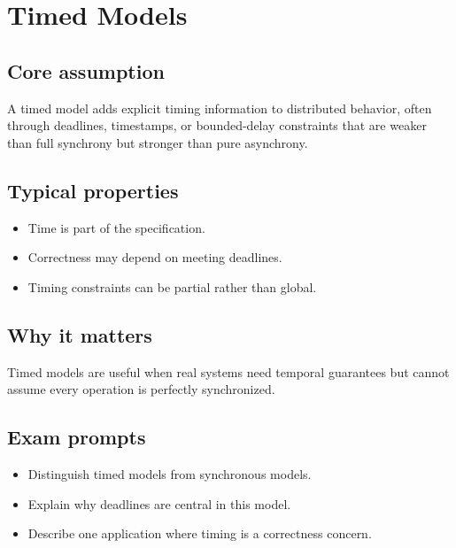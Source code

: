 \chapter{Timed Models}

\section{Core assumption}
\begin{defbox}
A timed model adds explicit timing information to distributed behavior, often through deadlines, timestamps, or bounded-delay constraints that are weaker than full synchrony but stronger than pure asynchrony.
\end{defbox}

\section{Typical properties}
\begin{itemize}
  \item Time is part of the specification.
  \item Correctness may depend on meeting deadlines.
  \item Timing constraints can be partial rather than global.
\end{itemize}

\section{Why it matters}
\begin{keybox}
Timed models are useful when real systems need temporal guarantees but cannot assume every operation is perfectly synchronized.
\end{keybox}

\section{Exam prompts}
\begin{itemize}
  \item Distinguish timed models from synchronous models.
  \item Explain why deadlines are central in this model.
  \item Describe one application where timing is a correctness concern.
\end{itemize}
